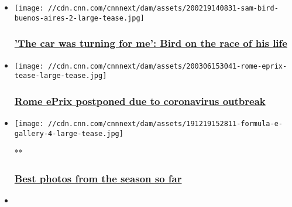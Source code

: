 \begin{itemize}
\item
  \href{/2020/02/20/motorsport/sam-bird-race-of-my-life-formula-e-spt-intl/index.html}{}

  \texttt{[image: //cdn.cnn.com/cnnnext/dam/assets/200219140831-sam-bird-buenos-aires-2-large-tease.jpg]}

  \hypertarget{the-car-was-turning-for-me-bird-on-the-race-of-his-life}{%
  \subsubsection{\texorpdfstring{\href{/2020/02/20/motorsport/sam-bird-race-of-my-life-formula-e-spt-intl/index.html}{'The
  car was turning for me': Bird on the race of his
  life}}{'The car was turning for me': Bird on the race of his life}}\label{the-car-was-turning-for-me-bird-on-the-race-of-his-life}}
\item
  \href{/2020/03/06/motorsport/rome-eprix-postponed-formula-e-supercharged-spt-intl/index.html}{}

  \texttt{[image: //cdn.cnn.com/cnnnext/dam/assets/200306153041-rome-eprix-tease-large-tease.jpg]}

  \hypertarget{rome-eprix-postponed-due-to-coronavirus-outbreak}{%
  \subsubsection{\texorpdfstring{\href{/2020/03/06/motorsport/rome-eprix-postponed-formula-e-supercharged-spt-intl/index.html}{Rome
  ePrix postponed due to coronavirus
  outbreak}}{Rome ePrix postponed due to coronavirus outbreak}}\label{rome-eprix-postponed-due-to-coronavirus-outbreak}}
\item
  \href{/2019/12/19/motorsport/gallery/formula-e-2019-20-season-spt-intl/index.html}{}

  \texttt{[image: //cdn.cnn.com/cnnnext/dam/assets/191219152811-formula-e-gallery-4-large-tease.jpg]}

  **

  \hypertarget{best-photos-from-the-season-so-far}{%
  \subsubsection{\texorpdfstring{\href{/2019/12/19/motorsport/gallery/formula-e-2019-20-season-spt-intl/index.html}{Best
  photos from the season so
  far}}{Best photos from the season so far}}\label{best-photos-from-the-season-so-far}}
\item
  \href{/2020/02/29/motorsport/marrakech-eprix-formula-e-supercharged-spt-intl/index.html}{}


\end{itemize}
